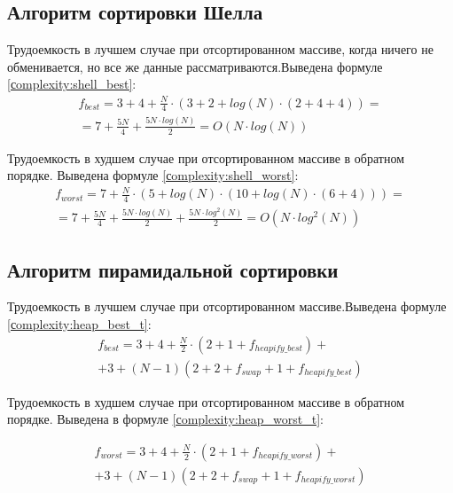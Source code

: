 \subsection{Алгоритм сортировки Шелла}

Трудоемкость в лучшем случае при отсортированном массиве, когда ничего не обменивается, но все же данные рассматриваются.Выведена формуле \ref{сomplexity:shell_best}:
\begin{equation}
	\label{сomplexity:shell_best}
	\begin{aligned}
		f_{best} = 3 + 4 + \frac{N}{4} \cdot (3 + 2 + log(N) \cdot (2 + 4 + 4)) = \\
		= 7 + \frac{5N}{4} + \frac{5N \cdot log(N)}{2} = O(N \cdot log(N))
	\end{aligned}
\end{equation}

Трудоемкость в худшем случае при отсортированном массиве в обратном порядке. Выведена формуле \ref{сomplexity:shell_worst}:
\begin{equation}
	\label{сomplexity:shell_worst}
	\begin{aligned}
		f_{worst} = 7 + \frac{N}{4} \cdot (5 + log(N) \cdot (10 + log(N) \cdot (6 + 4))) =\\
		= 7 + \frac{5N}{4} + \frac{5N \cdot log(N)}{2} + \frac{5N \cdot log^2(N)}{2} = O(N \cdot log^2(N))
	\end{aligned}
\end{equation}

\subsection{Алгоритм пирамидальной сортировки}

Трудоемкость в лучшем случае при отсортированном массиве.Выведена формуле \ref{сomplexity:heap_best_t}:
\begin{equation}
	\label{сomplexity:heap_best_t}
	\begin{aligned}
		f_{best} = 3 + 4 + \frac{N}{2} \cdot (2 + 1 + f_{heapify\_best}) + \\
		+ 3 + (N - 1)(2 + 2 + f_{swap} + 1 + f_{heapify\_best})
	\end{aligned}
\end{equation}

Трудоемкость в худшем случае при отсортированном массиве в обратном порядке. Выведена в формуле \ref{сomplexity:heap_worst_t}:

\begin{equation}
	\label{сomplexity:heap_worst_t}
	\begin{aligned}
		f_{worst} = 3 + 4 + \frac{N}{2} \cdot (2 + 1 + f_{heapify\_worst}) + \\
		+ 3 + (N - 1)(2 + 2 + f_{swap} + 1 + f_{heapify\_worst})
	\end{aligned}
\end{equation}

